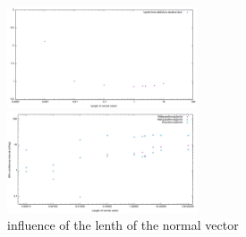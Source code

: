\documentclass[twoside,twocolumn,11pt]{article} %
\begin{document}
\begin{figure}
	\begin{minipage}{\textwidth}
		\includegraphics[width=0.5\textwidth]{figures/NormVsTime.pdf}
	\end{minipage}
	\begin{minipage}{\textwidth}
		\includegraphics[width=0.5\textwidth]{figures/NormVsSigmaAZ.pdf}
	\end{minipage}
\caption{influence of the lenth of the normal vector}
\label{fig:norminfl2}
\end{figure}
\end{document}
